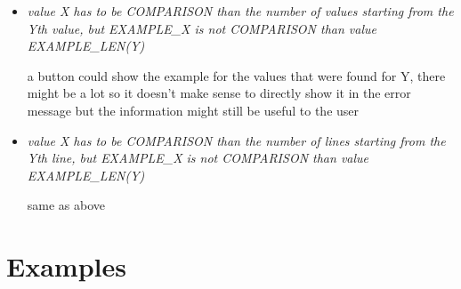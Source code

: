 \documentclass[11pt]{article}
\begin{document}
\begin{itemize}
\item \textit{value X has to be COMPARISON than the number of values starting from the Yth value, but EXAMPLE\_X is not COMPARISON than value EXAMPLE\_LEN(Y)}

a button could show the example for the values that were found for Y, there might be a lot so it doesn't make sense to directly show it in the error message but the information might still be useful to the user

\item \textit{value X has to be COMPARISON than the number of lines starting from the Yth line, but EXAMPLE\_X is not COMPARISON than value EXAMPLE\_LEN(Y)}

same as above

\end{itemize}

\section{Examples}
\end{document}
